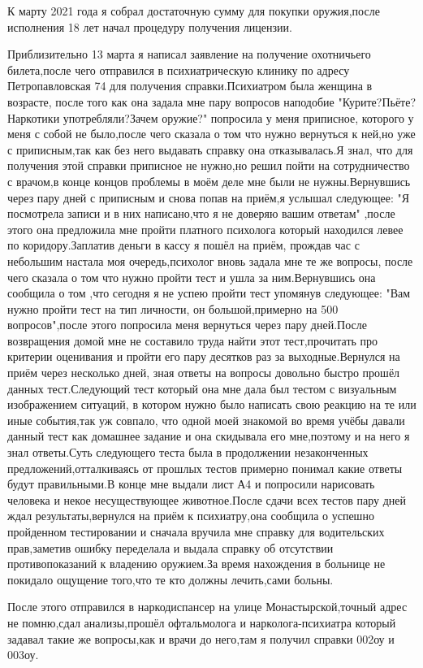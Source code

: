 \begin{itemize}
К марту 2021 года я собрал достаточную сумму для покупки оружия,после
исполнения 18 лет начал процедуру получения лицензии.

Приблизительно 13 марта я написал заявление на получение охотничьего
билета,после чего отправился в психиатрическую клинику по адресу
Петропавловская 74 для получения справки.Психиатром была женщина в возрасте,
после того как она задала мне пару вопросов наподобие "Курите?Пьёте?Наркотики
употребляли?Зачем оружие?" попросила у меня приписное, которого у меня с собой
не было,после чего сказала о том что нужно вернуться к ней,но уже с
приписным,так как без него выдавать справку она отказывалась.Я знал, что для
получения этой справки приписное не нужно,но решил пойти на сотрудничество с
врачом,в конце концов проблемы в моём деле мне были не нужны.Вернувшись через
пару дней с приписным и снова попав на приём,я услышал следующее: "Я посмотрела
записи и в них написано,что я не доверяю вашим ответам" ,после этого она
предложила мне пройти платного психолога который находился левее по
коридору.Заплатив деньги в кассу я пошёл на приём, прождав час с небольшим
настала моя очередь,психолог вновь задала мне те же вопросы, после чего сказала
о том что нужно пройти тест и ушла за ним.Вернувшись она сообщила о том ,что
сегодня я не успею пройти тест упомянув следующее: "Вам нужно пройти тест на
тип личности, он большой,примерно на 500 вопросов",после этого попросила меня
вернуться через пару дней.После возвращения домой мне не составило труда найти
этот тест,прочитать про критерии оценивания и пройти его пару десятков раз за
выходные.Вернулся на приём через несколько дней, зная ответы на вопросы
довольно быстро прошёл данных тест.Следующий тест который она мне дала был
тестом с визуальным изображением ситуаций, в котором нужно было написать свою
реакцию на те или иные события,так уж совпало, что одной моей знакомой во время
учёбы давали данный тест как домашнее задание и она скидывала его мне,поэтому и
на него я знал ответы.Суть следующего теста была в продолжении незаконченных
предложений,отталкиваясь от прошлых тестов примерно понимал какие ответы будут
правильными.В конце мне выдали лист А4 и попросили нарисовать человека и некое
несуществующее животное.После сдачи всех тестов пару дней ждал
результаты,вернулся на приём к психиатру,она сообщила о успешно пройденном
тестировании и сначала вручила мне справку для водительских прав,заметив ошибку
переделала и выдала справку об отсутствии противопоказаний к владению
оружием.За время нахождения в больнице не покидало ощущение того,что те кто
должны лечить,сами больны.

После этого отправился в наркодиспансер на улице Монастырской,точный адрес не
помню,сдал анализы,прошёл офтальмолога и нарколога-психиатра который задавал
такие же вопросы,как и врачи до него,там я получил справки 002оу и 003оу.

\end{itemize} %
